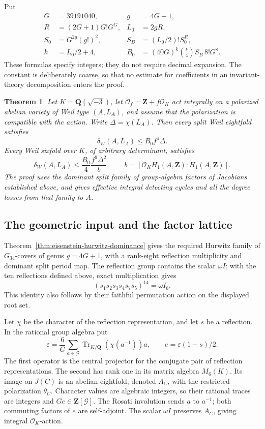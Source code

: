 \documentclass[11pt]{article}
\newtheorem{theorem}{Theorem}[section]
\theoremstyle{definition}
\theoremstyle{remark}
\newcommand{\Q}{\mathbf Q}
\newcommand{\Z}{\mathbf Z}
\begin{document}
Put
\begin{align*}
 G&=39191040,& g&=4G+1,\\
 R&=(2G+1)G!G^G,& L_0&=2gR,\\
 S_0&=G^{2g}(g!)^2,& S_B&=(L_0/2)!S_0^R,\\
 k&=L_0/2+4,&
 B_0&=(40G)^k\binom{k}{4}S_B\,8!G^8.
\end{align*}
These formulas specify integers; they do not require decimal expansion.
The constant is deliberately coarse, so that no estimate for coefficients
in an invariant-theory decomposition enters the proof.

\begin{theorem}\label{thm:eisenstein-eightfolds}
Let $K=\Q(\sqrt{-3})$, let $\mathcal O_f=\Z+f\mathcal O_K$ act
integrally on a polarized abelian variety of Weil type $(A,L_A)$, and
assume that the polarization is compatible with the action. Write
$\Delta=\chi(L_A)$. Then
every split Weil eightfold satisfies
\[
 \delta_W(A,L_A)\le B_0 f^4\Delta.
\]
Every Weil sixfold over $K$, of arbitrary determinant, satisfies
\[
 \delta_W(A,L_A)\le \frac{B_0}{4}
          \frac{f^9\Delta^2}{b},
 \qquad b=[\mathcal O_K H_1(A,\Z):H_1(A,\Z)].
\]
The proof uses the dominant split family of group-algebra factors of
Jacobians established above, and gives effective integral detecting
cycles and all the degree losses from that family to $A$.
\end{theorem}

\subsection{The geometric input and the factor lattice}

Theorem~\ref{thm:eisenstein-hurwitz-dominance} gives the required
Hurwitz family of $G_{34}$-covers of genus $g=4G+1$, with a rank-eight
reflection multiplicity and dominant split period map.  The reflection
group contains the scalar $\omega I$: with the ten reflections
defined above, exact multiplication gives
\[
                 (s_1s_2s_3s_4s_7s_5)^{14}=\omega I_6.
\]
This identity also follows by their faithful permutation action
on the displayed root set.

Let $\chi$ be the character of the reflection representation, and let
$s$ be a reflection. In the rational group algebra put
\[
 \varepsilon=\frac6G\sum_{a\in\mathcal G}
       \operatorname{Tr}_{K/\Q}(\chi(a^{-1}))a,
 \qquad e=\varepsilon(1-s)/2.
\]
The first operator is the central projector for the conjugate pair of
reflection representations. The second has rank one in its matrix
algebra $M_6(K)$. Its image on $J(C)$ is an abelian eightfold, denoted
$A_C$, with the restricted polarization $\theta_C$. Character values
are algebraic integers, so their rational traces are integers and
$Ge\in\Z[\mathcal G]$. The Rosati involution sends $a$ to $a^{-1}$;
both commuting factors of $e$ are self-adjoint. The scalar $\omega I$
preserves $A_C$, giving integral $\mathcal O_K$-action.
\end{document}
